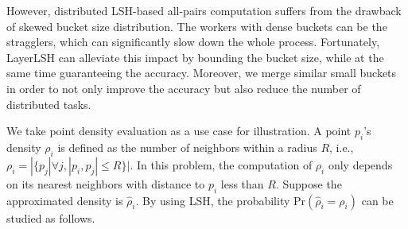 However, distributed LSH-based all-pairs computation suffers from the drawback of skewed bucket size distribution. The workers with dense buckets can be the stragglers, which can significantly slow down the whole process. Fortunately, LayerLSH can alleviate this impact by bounding the bucket size, while at the same time guaranteeing the accuracy. Moreover, we merge similar small buckets in order to not only improve the accuracy but also reduce the number of distributed tasks.

We take point density evaluation as a use case for illustration. A point $p_i$'s density $\rho_i$ is defined as the number of neighbors within a radius $R$, i.e., $\rho_i=|\{p_j|\forall j,|p_i,p_j|\leq R\}|$. In this problem, the computation of $\rho_i$ only depends on its nearest neighbors with distance to $p_i$ less than $R$. Suppose the approximated density is $\hat\rho_i$. By using LSH, the probability $\text{Pr}(\hat\rho_i=\rho_i)$ can be studied as follows.

